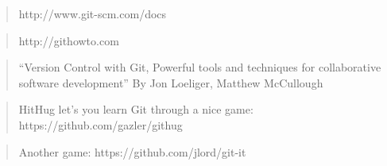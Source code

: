 \documentclass{article}
\begin{document}
    \begin{quote}
http://www.git-scm.com/docs

\end{quote}
\begin{quote}
http://githowto.com

\end{quote}
\begin{quote}
``Version Control with Git, Powerful tools and techniques for
collaborative software development'' By Jon Loeliger, Matthew McCullough

\end{quote}
\begin{quote}
HitHug let's you learn Git through a nice game:
https://github.com/gazler/githug

\end{quote}
\begin{quote}
Another game: https://github.com/jlord/git-it

\end{quote}


    
    
    
    
\end{document}
